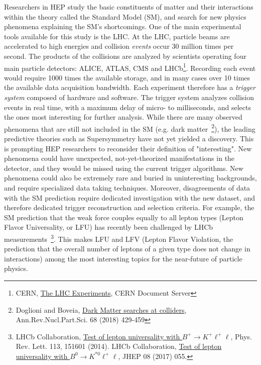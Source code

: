 Researchers in HEP study the basic constituents of matter and their interactions within the theory called the Standard Model (SM), and search for new physics phenomena explaining the SM's shortcomings. 
One of the main experimental tools available for this study is the LHC. 
At the LHC, particle beams are accelerated to high energies and 
collision \textit{events} occur 30 million times per second. 
The products of the collisions are analyzed by scientists operating four main particle detectors: ALICE, ATLAS, CMS and LHCb\footnote{CERN, \href{http://cds.cern.ch/record/1997374}{The LHC Experiments}, CERN Document Server}.
Recording each event would require 1000 times the available storage, and in many cases over 10 times the available data acquisition bandwidth.
Each experiment therefore has a \textit{trigger system} composed of hardware and software.
The trigger system analyzes collision events in real time, with a maximum delay of micro- to milliseconds, and selects the ones most interesting for further analysis. 
While there are many observed phenomena that are still not included in the SM (e.g. dark matter~\footnote{Doglioni and Boveia, \href{https://arxiv.org/abs/arXiv:1810.12238}{Dark Matter searches at colliders}, Ann.Rev.Nucl.Part.Sci. 68 (2018) 429-459}), the leading predictive theories such as Supersymmetry have not yet yielded a discovery. 
This is prompting HEP researchers to reconsider their definition of "interesting". 
New phenomena could have unexpected, not-yet-theorized manifestations in the detector, and they would be missed using the current trigger algorithms. 
New phenomena could also be extremely rare and buried in uninteresting backgrounds, and require specialized data taking techniques. 
Moreover, disagreements of data with the SM prediction require dedicated investigation with the new dataset, and therefore dedicated trigger reconstruction and selection criteria. 
For example, the SM prediction that the weak force couples equally to all lepton types (Lepton Flavor Universality, or LFU) has recently been challenged by LHCb measurements~\footnote{LHCb Collaboration, \href{https://arxiv.org/abs/1705.05802}{Test of lepton universality with $ B^{+}\rightarrow K^{+}\ell^{+}\ell$}, Phys. Rev. Lett. 113, 151601 (2014). LHCb Collaboration, \href{https://arxiv.org/abs/1705.05802}{Test of lepton universality with $B^{0}\rightarrow K^{* 0}\ell^{+}\ell$}, JHEP 08 (2017) 055.}. This makes LFU and LFV (Lepton Flavor Violation, the prediction that the overall number of leptons of a given type does not change in interactions) among the most interesting topics for the near-future of particle physics. 
